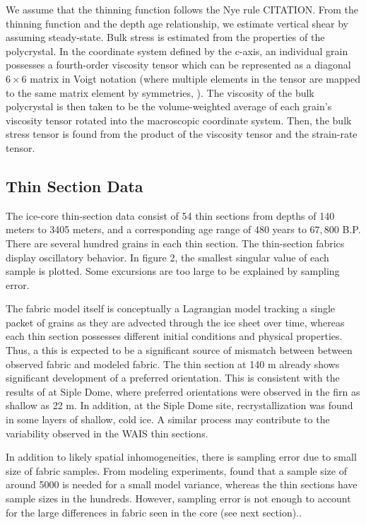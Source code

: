 \documentclass{igs}
\begin{document}
We assume that the thinning function follows the Nye rule CITATION. From the thinning function and the depth age relationship, we estimate vertical shear by assuming steady-state. Bulk stress is estimated from the properties of the polycrystal. In the coordinate system defined by the c-axis, an individual grain possesses a fourth-order viscosity tensor which can be represented as a diagonal $6 \times 6$ matrix in Voigt notation (where multiple elements in the tensor are mapped to the same matrix element by symmetries, \citet{vnote}). The viscosity of the bulk polycrystal is then taken to be the volume-weighted average of each grain's viscosity tensor rotated into the macroscopic coordinate system. Then, the bulk stress tensor is found from the product of the viscosity tensor and the strain-rate tensor. 

\subsection{Thin Section Data}
The ice-core thin-section data consist of 54 thin sections from depths of 140 meters to 3405 meters, and a corresponding age range of 480 years to $67,800$ B.P. There are several hundred grains in each thin section. The thin-section fabrics display oscillatory behavior. In figure 2, the smallest singular value of each sample is plotted. Some excursions are too large to be explained by sampling error.  

The fabric model itself is conceptually a Lagrangian model tracking a single packet of grains as they are advected through the ice sheet over time, whereas each thin section possesses different initial conditions and physical properties. Thus, a this is expected to be a significant source of mismatch between between observed fabric and modeled fabric. The thin section at 140 m already shows significant development of a preferred orientation. This is consistent with the results of \citet{diprinzio2005} at Siple Dome, where preferred orientations were observed in the firn as shallow as 22 m. In addition, at the Siple Dome site, recrystallization was found in some layers of shallow, cold ice. A similar process may contribute to the variability observed in the WAIS thin sections.

 In addition to likely spatial inhomogeneities, there is sampling error due to small size of fabric samples. From modeling experiments, \citet{thorsteinsson2002nni} found that a sample size of around 5000 is needed for a small model variance, whereas the thin sections have sample sizes in the hundreds. However, sampling error is not enough to account for the large differences in fabric seen in the core (see next section)..    
\end{document}
